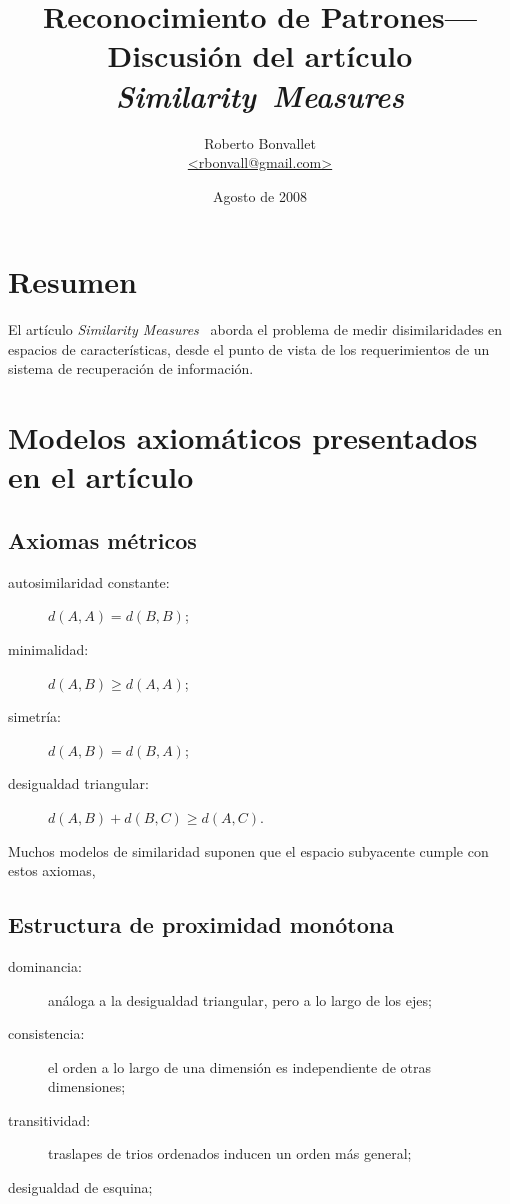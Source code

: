 \documentclass[spanish]{article}
\title{Reconocimiento de Patrones---Discusión del artículo \textit{Similarity~Measures}}
\author{Roberto Bonvallet \\ \url {<rbonvall@gmail.com>}}
\date{Agosto de 2008}
\begin{document}
\maketitle

\section{Resumen}
El artículo \textit{Similarity Measures}~\cite{sim} aborda el problema de medir
disimilaridades en espacios de características, desde el punto de vista de los
requerimientos de un sistema de recuperación de información.


\section{Modelos axiomáticos presentados en el artículo}
\subsection{Axiomas métricos}

\begin{description}
    \item [autosimilaridad constante:]
        $d(A, A) = d(B, B)$;
    \item [minimalidad:]
        $d(A, B)\ge d(A, A)$;
    \item [simetría:]
        $d(A, B) = d(B, A)$;
    \item [desigualdad triangular:]
        $d(A, B) + d(B, C)\ge d(A, C)$.
\end{description}
Muchos modelos de similaridad suponen que el espacio subyacente cumple con estos axiomas,



\subsection{Estructura de proximidad monótona}
\begin{description}
    \item [dominancia:]
        análoga a la desigualdad triangular, pero a lo largo de los ejes;
    \item [consistencia:]
        el orden a lo largo de una dimensión es independiente de otras
        dimensiones;
    \item [transitividad:]
        traslapes de trios ordenados inducen un orden más general;
    \item [desigualdad de esquina;]
\end{description}
\end{document}
